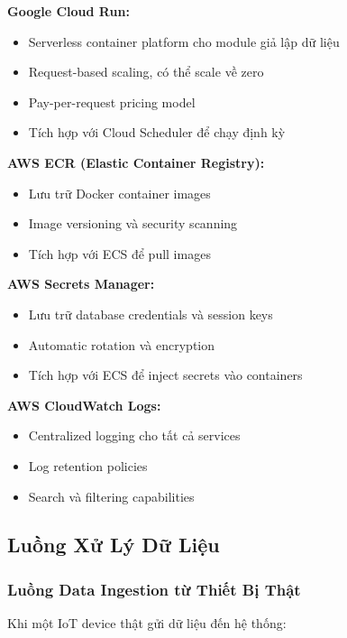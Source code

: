 \textbf{Google Cloud Run:}
\begin{itemize}
    \item Serverless container platform cho module giả lập dữ liệu
    \item Request-based scaling, có thể scale về zero
    \item Pay-per-request pricing model
    \item Tích hợp với Cloud Scheduler để chạy định kỳ
\end{itemize}

\textbf{AWS ECR (Elastic Container Registry):}
\begin{itemize}
    \item Lưu trữ Docker container images
    \item Image versioning và security scanning
    \item Tích hợp với ECS để pull images
\end{itemize}

\textbf{AWS Secrets Manager:}
\begin{itemize}
    \item Lưu trữ database credentials và session keys
    \item Automatic rotation và encryption
    \item Tích hợp với ECS để inject secrets vào containers
\end{itemize}

\textbf{AWS CloudWatch Logs:}
\begin{itemize}
    \item Centralized logging cho tất cả services
    \item Log retention policies
    \item Search và filtering capabilities
\end{itemize}

\subsection{Luồng Xử Lý Dữ Liệu}

\subsubsection{Luồng Data Ingestion từ Thiết Bị Thật}

Khi một IoT device thật gửi dữ liệu đến hệ thống:

